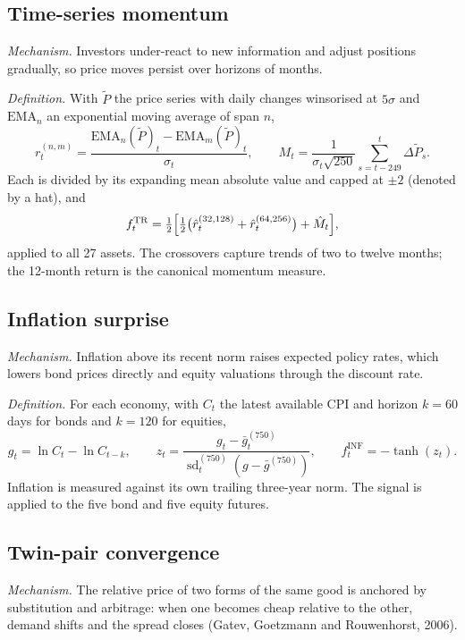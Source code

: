 \documentclass[10.5pt,a4paper]{article}
\begin{document}
\subsection{Time-series momentum}
\textit{Mechanism.} Investors under-react to new information and adjust positions gradually, so price moves persist over horizons of months.

\textit{Definition.} With $\tilde P$ the price series with daily changes winsorised at $5\sigma$ and $\mathrm{EMA}_n$ an exponential moving average of span $n$,
\begin{equation}
r^{(n,m)}_{t}=\frac{\mathrm{EMA}_n(\tilde P)_t-\mathrm{EMA}_m(\tilde P)_t}{\sigma_t},\qquad
M_t=\frac{1}{\sigma_t\sqrt{250}}\sum_{s=t-249}^{t}\Delta\tilde P_s .
\end{equation}
Each is divided by its expanding mean absolute value and capped at $\pm2$ (denoted by a hat), and
\begin{equation}
f^{\mathrm{TR}}_t=\tfrac12\Bigl[\tfrac12\bigl(\hat r^{(32,128)}_t+\hat r^{(64,256)}_t\bigr)+\hat M_t\Bigr],
\end{equation}
applied to all 27 assets. The crossovers capture trends of two to twelve months; the 12-month return is the canonical momentum measure.

\subsection{Inflation surprise}
\textit{Mechanism.} Inflation above its recent norm raises expected policy rates, which lowers bond prices directly and equity valuations through the discount rate.

\textit{Definition.} For each economy, with $C_t$ the latest available CPI and horizon $k=60$ days for bonds and $k=120$ for equities,
\begin{equation}
g_t=\ln C_t-\ln C_{t-k},\qquad
z_t=\frac{g_t-\bar g^{(750)}_t}{\operatorname{sd}^{(750)}_t\!\left(g-\bar g^{(750)}\right)},\qquad
f^{\mathrm{INF}}_t=-\tanh(z_t).
\end{equation}
Inflation is measured against its own trailing three-year norm. The signal is applied to the five bond and five equity futures.

\subsection{Twin-pair convergence}
\textit{Mechanism.} The relative price of two forms of the same good is anchored by substitution and arbitrage: when one becomes cheap relative to the other, demand shifts and the spread closes (Gatev, Goetzmann and Rouwenhorst, 2006).
\end{document}
